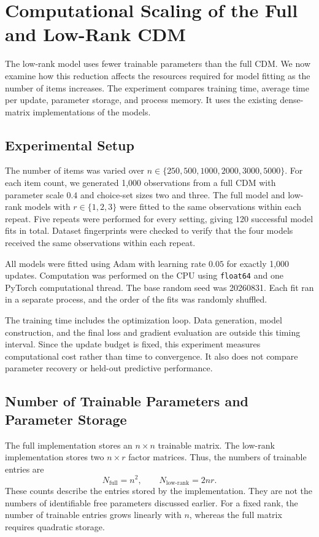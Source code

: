 \documentclass[12pt,oneside]{report}
\begin{document}
\section{Computational Scaling of the Full and Low-Rank CDM}
\label{sec:full-low-rank-resource-scaling}

The low-rank model uses fewer trainable parameters than the full CDM.
We now examine how this reduction affects the resources required for
model fitting as the number of items increases. The experiment compares
training time, average time per update, parameter storage, and process
memory. It uses the existing dense-matrix implementations of the models.

\subsection{Experimental Setup}

The number of items was varied over
$n\in\{250,500,1000,2000,3000,5000\}$. For each item count, we generated
1,000 observations from a full CDM with parameter scale $0.4$ and
choice-set sizes two and three. The full model and low-rank models with
$r\in\{1,2,3\}$ were fitted to the same observations within each repeat.
Five repeats were performed for every setting, giving 120 successful
model fits in total. Dataset fingerprints were checked to verify that
the four models received the same observations within each repeat.

All models were fitted using Adam with learning rate $0.05$ for exactly
1,000 updates. Computation was performed on the CPU using
\texttt{float64} and one PyTorch computational thread. The base random
seed was 20260831. Each fit ran in a separate process, and the order of
the fits was randomly shuffled.

The training time includes the optimization loop. Data generation, model
construction, and the final loss and gradient evaluation are outside
this timing interval. Since the update budget is fixed, this experiment
measures computational cost rather than time to convergence. It also
does not compare parameter recovery or held-out predictive performance.

\subsection{Number of Trainable Parameters and Parameter Storage}

The full implementation stores an $n\times n$ trainable matrix. The
low-rank implementation stores two $n\times r$ factor matrices. Thus,
the numbers of trainable entries are
\begin{equation}
    N_{\mathrm{full}}=n^2,
    \qquad
    N_{\mathrm{low\text{-}rank}}=2nr.
    \label{eq:resource-trainable-entries}
\end{equation}
These counts describe the entries stored by the implementation. They
are not the numbers of identifiable free parameters discussed earlier.
For a fixed rank, the number of trainable entries grows linearly with
$n$, whereas the full matrix requires quadratic storage.
\end{document}
